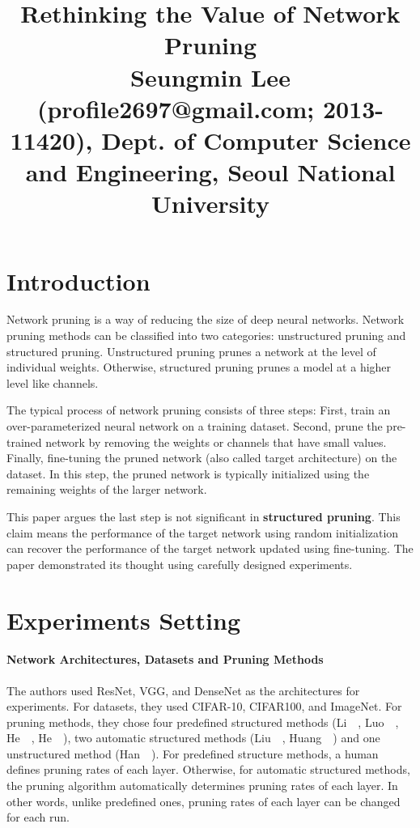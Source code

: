 \documentclass[10pt,twocolumn,letterpaper]{article}
\begin{document}
\title{Rethinking the Value of Network Pruning
	 \\ {\rm {\normalsize Seungmin Lee (profile2697@gmail.com; 2013-11420), Dept. of Computer Science and Engineering, Seoul National University}}} 

\maketitle
\thispagestyle{empty}


\section{Introduction}
Network pruning is a way of reducing the size of deep neural networks. 
Network pruning methods can be classified into two categories: unstructured pruning and structured pruning. Unstructured pruning prunes a network at the level of individual weights. Otherwise, structured pruning prunes a model at a higher level like channels.

The typical process of network pruning consists of three steps: First, train an over-parameterized neural network on a training dataset.  Second, prune the pre-trained network by removing the weights or channels that have small values. Finally, fine-tuning the pruned network (also called target architecture) on the dataset. In this step, the pruned network is typically initialized using the remaining weights of the larger network. 

This paper argues the last step is not significant in \textbf{structured pruning}. This claim means the performance of the target network using random initialization can recover the performance of the target network updated using fine-tuning. The paper demonstrated its thought using carefully designed experiments. 
 
\section{Experiments Setting}
\paragraph{Network Architectures, Datasets and Pruning Methods}
The authors used ResNet, VGG, and DenseNet as the architectures for experiments. For datasets, they used CIFAR-10, CIFAR100, and ImageNet. For pruning methods, they chose four predefined structured methods (Li~\etal~\cite{Li2017}, Luo~\etal~\cite{Luo2017}, He~\etal~\cite{He2017b}, He~\etal~\cite{He2018a}), two automatic structured methods (Liu~\etal~\cite{Liu2017}, Huang~\etal~\cite{Huang2018}) and one unstructured method (Han~\etal~\cite{Han2015}). For predefined structure methods, a human defines pruning rates of each layer. Otherwise, for automatic structured methods, the pruning algorithm automatically determines pruning rates of each layer. In other words, unlike predefined ones, pruning rates of each layer can be changed for each run. 
\end{document}
